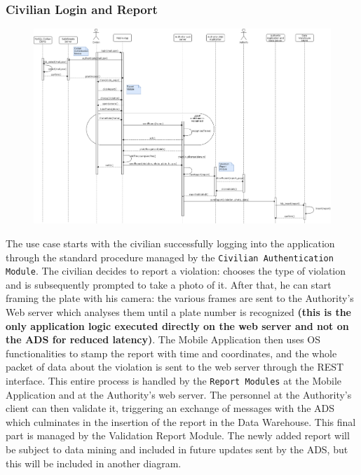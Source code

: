 \documentclass[12pt,a4paper]{article}
\begin{document}
\subsubsection{Civilian Login and Report}
\begin{figure}[H]
\begin{adjustwidth}{-25mm}{-25mm}
				\centering				
					        \includegraphics[width=0.75\paperwidth]{Images/Civilian_report}
\end{adjustwidth}
\end{figure}
The use case starts with the civilian successfully logging into the application through the standard procedure managed by the \texttt{Civilian Authentication Module}. The civilian decides to report a violation: chooses the type of violation and is subsequently prompted to take a photo of it. After that, he can start framing the plate with his camera: the various frames are sent to the Authority's Web server which analyses them until a plate number is recognized \textbf{(this is the only application logic executed directly on the web server and not on the ADS for reduced latency)}. The Mobile Application then uses OS functionalities to stamp the report with time and coordinates, and the whole packet of data about the violation is sent to the web server through the REST interface. This entire process is handled by the \texttt{Report Modules} at the Mobile Application and at the Authority's web server. The personnel at the Authority's client can then validate it, triggering an exchange of messages with the ADS which culminates in the insertion of the report in the Data Warehouse. This final part is managed by the {Validation Report Module}. The newly added report will be subject to data mining and included in future updates sent by the ADS, but this will be included in another diagram.
\end{document}
